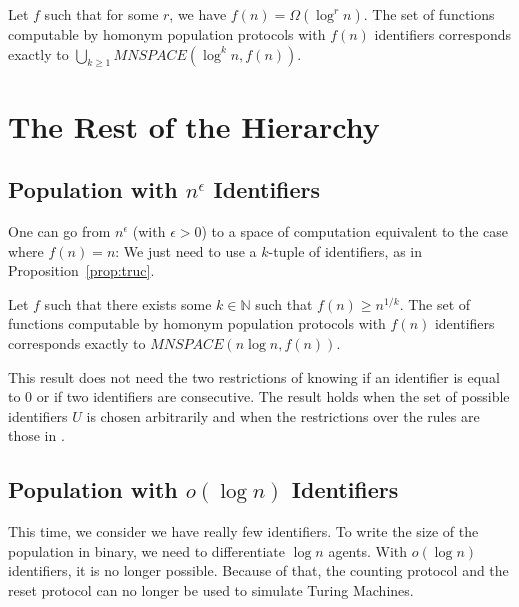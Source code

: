 \documentclass[UKenglish]{llncs}
\begin{document}
\begin{theorem}\label{th:main}
Let $f$  such that for some $r$, we have $f(n)=\Omega(\log^r n)$.
The set of functions computable by homonym population protocols with $f(n)$
identifiers corresponds exactly to $\bigcup_{k\ge1}MNSPACE(\log^kn,f(n))$.

\end{theorem}

\section{The Rest of the Hierarchy}\label{resthirera}

\subsection{Population with $n^\epsilon$ Identifiers}

One can go from  $n^\epsilon$ (with $\epsilon >0$) to a space of
computation equivalent to the case where $f(n)=n$:  We just need to use a $k$-tuple of identifiers,
as in Proposition~\ref{prop:truc}.





\begin{theorem}\label{th:sqrt}
Let $f$ such that there exists some $k\in \mathbb{N}$ such that $f(n)\ge n^{1/k}$.
The set of functions computable by homonym population protocols with $f(n)$
identifiers corresponds exactly to $MNSPACE(n\log n,f(n))$.
\end{theorem}





\begin{remark}
This result does not need the two restrictions of knowing if an identifier is equal to $0$ or if
two identifiers are consecutive. The result holds when the set of possible identifiers
$U$ is chosen arbitrarily and when the
restrictions over the rules are those in \cite{guerraoui2009names}.
\end{remark}

\subsection{Population with $o(\log n)$ Identifiers}

This time, we consider we have really few identifiers.
To write the size of the population in binary, we need to differentiate
$\log n$ agents. With $o(\log n)$ identifiers, it is no longer possible.
Because of that, the counting protocol and the reset protocol can no longer
be used to simulate Turing Machines.
\end{document}
